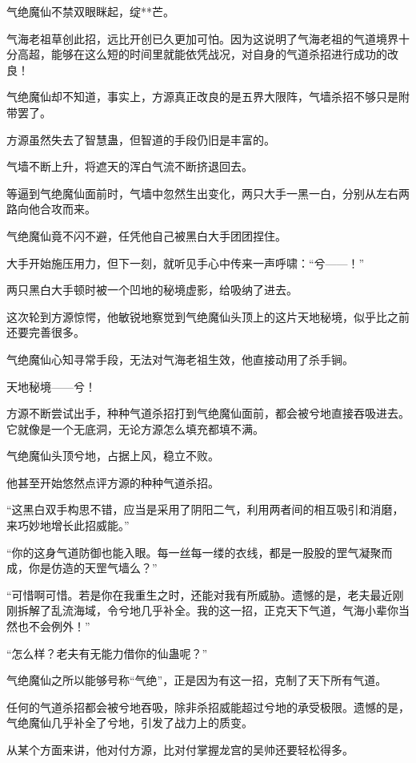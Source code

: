 \begin{this_body}
气绝魔仙不禁双眼眯起，绽**芒。

气海老祖草创此招，远比开创已久更加可怕。因为这说明了气海老祖的气道境界十分高超，能够在这么短的时间里就能依凭战况，对自身的气道杀招进行成功的改良！

气绝魔仙却不知道，事实上，方源真正改良的是五界大限阵，气墙杀招不够只是附带罢了。

方源虽然失去了智慧蛊，但智道的手段仍旧是丰富的。

气墙不断上升，将遮天的浑白气流不断挤退回去。

等逼到气绝魔仙面前时，气墙中忽然生出变化，两只大手一黑一白，分别从左右两路向他合攻而来。

气绝魔仙竟不闪不避，任凭他自己被黑白大手团团捏住。

大手开始施压用力，但下一刻，就听见手心中传来一声呼啸：“兮——！”

两只黑白大手顿时被一个凹地的秘境虚影，给吸纳了进去。

这次轮到方源惊愕，他敏锐地察觉到气绝魔仙头顶上的这片天地秘境，似乎比之前还要完善很多。

气绝魔仙心知寻常手段，无法对气海老祖生效，他直接动用了杀手锏。

天地秘境——兮！

方源不断尝试出手，种种气道杀招打到气绝魔仙面前，都会被兮地直接吞吸进去。它就像是一个无底洞，无论方源怎么填充都填不满。

气绝魔仙头顶兮地，占据上风，稳立不败。

他甚至开始悠然点评方源的种种气道杀招。

“这黑白双手构思不错，应当是采用了阴阳二气，利用两者间的相互吸引和消磨，来巧妙地增长此招威能。”

“你的这身气道防御也能入眼。每一丝每一缕的衣线，都是一股股的罡气凝聚而成，你是仿造的天罡气墙么？”

“可惜啊可惜。若是你在我重生之时，还能对我有所威胁。遗憾的是，老夫最近刚刚拆解了乱流海域，令兮地几乎补全。我的这一招，正克天下气道，气海小辈你当然也不会例外！”

“怎么样？老夫有无能力借你的仙蛊呢？”

气绝魔仙之所以能够号称“气绝”，正是因为有这一招，克制了天下所有气道。

任何的气道杀招都会被兮地吞吸，除非杀招威能超过兮地的承受极限。遗憾的是，气绝魔仙几乎补全了兮地，引发了战力上的质变。

从某个方面来讲，他对付方源，比对付掌握龙宫的吴帅还要轻松得多。

\end{this_body}

